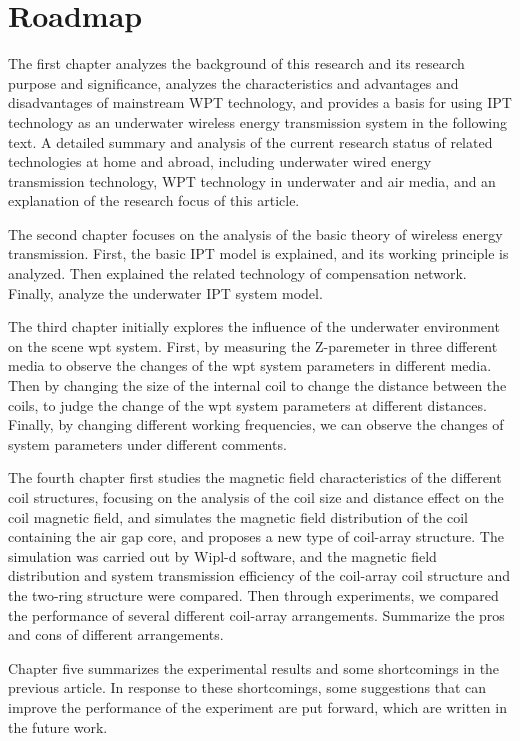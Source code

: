 \section{Roadmap}
The first chapter analyzes the background of this research and its research purpose and significance, analyzes the characteristics and advantages and disadvantages of mainstream WPT technology, and provides a basis for using IPT technology as an underwater wireless energy transmission system in the following text. A detailed summary and analysis of the current research status of related technologies at home and abroad, including underwater wired energy transmission technology, WPT technology in underwater and air media, and an explanation of the research focus of this article.

The second chapter focuses on the analysis of the basic theory of wireless energy transmission. First, the basic IPT model is explained, and its working principle is analyzed. Then explained the related technology of compensation network. Finally, analyze the underwater IPT system model.

The third chapter initially explores the influence of the underwater environment on the scene wpt system. First, by measuring the Z-paremeter in three different media to observe the changes of the wpt system parameters in different media. Then by changing the size of the internal coil to change the distance between the coils, to judge the change of the wpt system parameters at different distances. Finally, by changing different working frequencies, we can observe the changes of system parameters under different comments.

The fourth chapter first studies the magnetic field characteristics of the different coil structures, focusing on the analysis of the coil size and distance effect on the coil magnetic field, and simulates the magnetic field distribution of the coil containing the air gap core, and proposes a new type of coil-array structure. The simulation was carried out by Wipl-d software, and the magnetic field distribution and system transmission efficiency of the coil-array coil structure and the two-ring structure were compared. Then through experiments, we compared the performance of several different coil-array arrangements. Summarize the pros and cons of different arrangements.

Chapter five summarizes the experimental results and some shortcomings in the previous article. In response to these shortcomings, some suggestions that can improve the performance of the experiment are put forward, which are written in the future work.